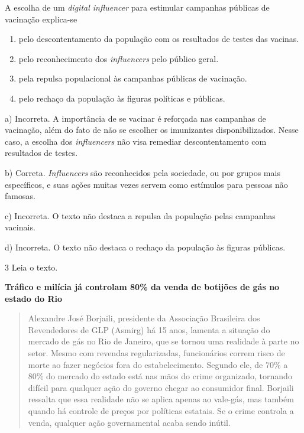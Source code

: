 A escolha de um \emph{digital influencer} para estimular campanhas
públicas de vacinação explica-se

\begin{enumerate}
\def\labelenumi{\alph{enumi})}
\item
  pelo descontentamento da população com os resultados de testes das
  vacinas.
\item
  pelo reconhecimento dos \emph{influencers} pelo público geral.
\item
  pela repulsa populacional às campanhas públicas de vacinação.
\item
  pelo rechaço da população às figuras políticas e públicas.
\end{enumerate}

a) Incorreta. A importância de se vacinar é reforçada nas campanhas de
vacinação, além do fato de não se escolher os imunizantes
disponibilizados. Nesse caso, a escolha dos \emph{influencers} não visa
remediar descontentamento com resultados de testes.

b) Correta. \emph{Influencers} são reconhecidos pela sociedade, ou por
grupos mais específicos, e suas ações muitas vezes servem como estímulos
para pessoas não famosas.

c) Incorreta. O texto não destaca a repulsa da população pelas campanhas
vacinais.

d) Incorreta. O texto não destaca o rechaço da população às figuras
públicas.

\num{3} Leia o texto.

\textbf{Tráfico e milícia já controlam 80\% da venda de botijões de gás no estado do Rio}

\begin{quote}
Alexandre José Borjaili, presidente da Associação Brasileira dos
Revendedores de GLP (Asmirg) há 15 anos, lamenta a situação do mercado
de gás no Rio de Janeiro, que se tornou uma realidade à parte no setor.
Mesmo com revendas regularizadas, funcionários correm risco de morte ao
fazer negócios fora do estabelecimento. Segundo ele, de 70\% a 80\% do
mercado do estado está nas mãos do crime organizado, tornando difícil
para qualquer ação do governo chegar ao consumidor final. Borjaili
ressalta que essa realidade não se aplica apenas ao vale-gás, mas também
quando há controle de preços por políticas estatais. Se o crime controla
a venda, qualquer ação governamental acaba sendo inútil.
\end{quote}


